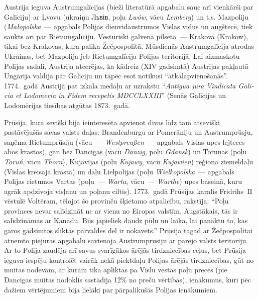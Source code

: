 \documentclass[twoside,a5paper,12pt,fleqn,openany]{extbook}
\newcommand{\pltxti}[1]{\textit{\textpolish{#1}}}
\newcommand{\detxti}[1]{\textit{\textgerman{#1}}}
\newcommand{\latxti}[1]{\textit{\textlatin{#1}}}
\newcommand{\uktxti}[1]{\textukrainian{#1}}
\begin{document}
Austrija ieguva Austrumgalīcijas (bieži literatūrā apgabalu sauc arī vienkārši par Galīciju) ar Ļvovu (ukraiņu \uktxti{Львів}, poļu \pltxti{Lwów}, vācu \detxti{Lemberg}) un t.s. Mazpoliju (\pltxti{Małopolska}~--- apgabals Polijas dienvidaustrumos Vislas vidus un augštecē, tiek saukts arī par Rietumgalīciju. Vēsturiski galvenā pilsēta~--- Krakova (Krakow), tikai bez Krakovas, kura palika Žečpospolitā. Mūsdienās Austrumgalīcija atrodas Ukrainas, bet Mazpolija jeb Rietumgalīcija Polijas teritorijā. Lai aizmaskotu Polijas sadali, Austrija atcerējas, ka kādreiz (XIV gadsimtā) Austrijas pakļautā Ungārija valdīja pār Galīciju un tāpēc esot notikusi ``atkalapvienošanās''. 1774.~gadā Austrijā pat izkala medaļu ar uzrakstu ``\latxti{Antigua jura Vindicata Galicia et Lodomeria in Fidem recepetis MDCCLXXIII}'' (Senās Galīcijas un Lodomērijas tiesības atgūtas 1873.~gadā.

Prūsija, kura sevišķi bija ieinteresēta apvienot divas līdz tam atsevišķi pastāvējušās savas valsts daļas: Brandenburgu ar Pomerāniju un Austrumprūsju, saņēma Rietumprūsiju (vācu~--- \detxti{Westpreußen}~--- apgabals Vislas upes lejteces abos krastos), gan bez Dancigas (vācu \detxti{Danzig}, poļu \pltxti{Gdansk}) un Toruņas (poļu \pltxti{Toruń}, vācu \detxti{Thorn}), Kujāvijas (poļu \pltxti{Kujawy}, vācu \detxti{Kujawien}) reģiona ziemeļdaļu (Vislas kreisajā krastā) un daļu Lielpolijas (poļu \pltxti{Wielkopolska}~--- apgabals Polijas rietumos Vartas (poļu~--- \pltxti{Warta}, vācu~--- \detxti{Warthe}) upes baseinā, kuru agrāk apdzīvoja visļanu un poļanu ciltis). 1773.~gadā Prūsijas karalis Fridrihs~II vēstulē Voltēram, tēlojot šo provinču šķietamo atpalicību, rakstīja: ``Poļu provinces nevar salīdzināt ne ar vienu no Eiropas valstīm. Augstākais, tās ir salīdzināmas ar Kanādu. Būs jāpieliek daudz pūļu un laika, lai panāktu to, kas garos gadsimtos sliktas pārvaldes dēļ ir nokavēts.'' Prūsija tagad ar Žečpospolitai atņemto piejūras apgabalu savienoja Austrumprūsiju ar pārējo valsts teritoriju. Ar to Polija zaudēja arī savus svarīgākos ārējās tirdzniecības ceļus, bet Prūsija ieguva iespēju kontrolēt vairāk nekā piektdaļu Polijas ārējās tirdzniecības, gūt no muitas nodevām, ar kurām tika apliktas pa Vislu vestās poļu preces (pie Dancigas muitas nodoklis sastādīja 12\% no preču vērtības), ienākumus, kuri pēc dažiem vērtējumiem bija lielāki par pārpalikušās Polijas ienākumiem.
\end{document}
